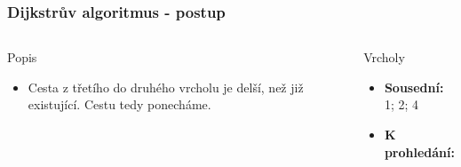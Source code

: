 \documentclass{beamer}
\begin{document}
\begin{frame}
    \frametitle{Dijkstrův algoritmus - postup}
    \begin{columns}
        \begin{block}{Popis}
            \begin{itemize}
                \item Cesta z třetího do druhého vrcholu je delší, než již existující. Cestu tedy ponecháme.
            \end{itemize}
        \end{block}
        \begin{block}{Vrcholy}
            \begin{itemize}
                \item \textbf{Sousední:} 1; 2; 4 
                \item \textbf{K prohledání:} 
            \end{itemize}
        \end{block}
    \end{columns}
\end{frame}
\end{document}
